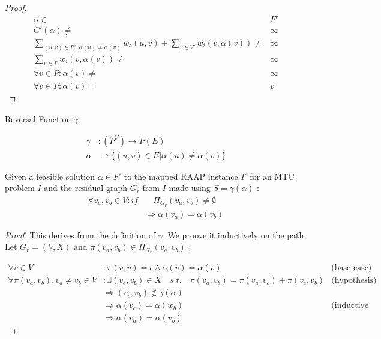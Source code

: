 \documentclass{article}
\begin{document}
\begin{proof}
\begin{align}
	\nonumber \alpha \in & F' \\
	\nonumber C'(\alpha) \neq & \infty \\
	\nonumber \displaystyle\sum\limits_{(u,v) \in E' : \alpha(u) \neq \alpha(v)} w_c(u,v) + \displaystyle\sum\limits_{v \in V'} w_i(v, \alpha(v)) \neq & \infty \\
	\nonumber \displaystyle\sum\limits_{v \in P} w_i(v, \alpha(v)) \neq & \infty \\
	\nonumber \forall v \in P : \alpha(v) \neq & \infty \\
	\nonumber \forall v \in P : \alpha(v) = & v
\end{align}
\end{proof}

\begin{definition}
Reversal Function $\gamma$

\begin{align}
	\nonumber \gamma & : (P^V) \rightarrow P(E) \\
	\nonumber \alpha & \mapsto \{(u,v) \in E | \alpha(u) \neq \alpha(v)\}
\end{align}
\end{definition}

\begin{lemma}
\label{PATHASSIGN}
Given a feasible solution $\alpha \in F'$ to the mapped RAAP instance $I'$ for an MTC problem $I$ and the residual graph $G_r$ from $I$ made using $S = \gamma(\alpha)$ :
\begin{align}
	\nonumber \forall v_a, v_b \in V : if & \quad \Pi_{G_r}(v_a, v_b) \neq \emptyset \\
	\nonumber & \Rightarrow \alpha(v_a) = \alpha(v_b)
\end{align}
\end{lemma}

\begin{proof}
This derives from the definition of $\gamma$.
We proove it inductively on the path.
Let $G_r = (V, X)$ and $\pi(v_a, v_b) \in \Pi_{G_r}(v_a, v_b)$ :

\begin{align}
	\nonumber \forall v \in V & : \pi(v, v) = \epsilon \wedge \alpha(v) = \alpha(v) & \mbox{(base case)} \\
	\nonumber \forall \pi(v_a, v_b), v_a \neq v_b \in V & : \exists (v_c, v_b) \in X \quad s.t. \quad \pi(v_a, v_b) = \pi(v_a, v_c) + \pi(v_c, v_b) & \mbox{(hypothesis)}\\
	\nonumber & \Rightarrow (v_c, v_b) \not\in \gamma(\alpha) \\
	\nonumber & \Rightarrow \alpha(v_c) = \alpha(w_b) & \mbox{(inductive step)} \\
	\nonumber & \Rightarrow \alpha(v_a) = \alpha(v_b)
\end{align}

\end{proof}
\end{document}
